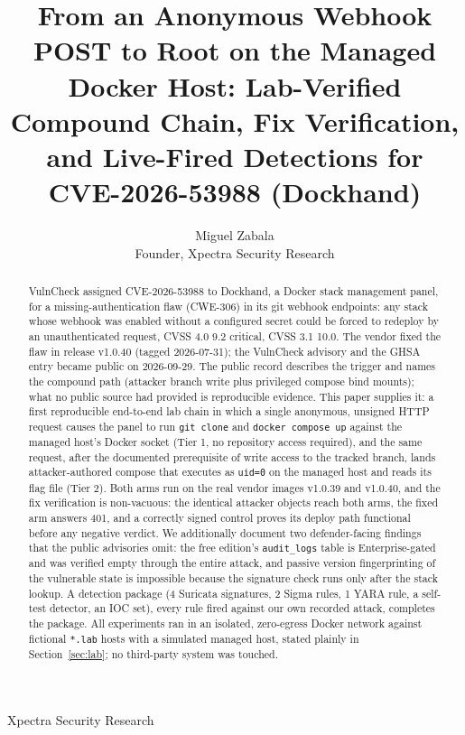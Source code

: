 \documentclass[journal]{IEEEtran}
\begin{document}
\title{From an Anonymous Webhook POST to Root on the Managed Docker Host:
Lab-Verified Compound Chain, Fix Verification, and Live-Fired Detections for
CVE-2026-53988 (Dockhand)}

\author{Miguel Zabala\\[0.5ex]
\small Founder, Xpectra Security Research}

{Xpectra Security Research \MakeLowercase\expandafter\the\year}

\maketitle

\begin{abstract}
VulnCheck assigned CVE-2026-53988 to Dockhand, a Docker stack management panel,
for a missing-authentication flaw (CWE-306) in its git webhook endpoints: any
stack whose webhook was enabled without a configured secret could be forced to
redeploy by an unauthenticated request, CVSS 4.0 9.2 critical, CVSS 3.1 10.0.
The vendor fixed the flaw in release v1.0.40 (tagged 2026-07-31); the VulnCheck
advisory and the GHSA entry became public on 2026-09-29. The public record
describes the trigger and names the compound path (attacker branch write plus
privileged compose bind mounts); what no public source had provided is
reproducible evidence. This paper supplies it: a first reproducible end-to-end
lab chain in which a single anonymous, unsigned HTTP request causes the panel
to run \texttt{git clone} and \texttt{docker compose up} against the managed
host's Docker socket (Tier 1, no repository access required), and the same
request, after the documented prerequisite of write access to the tracked
branch, lands attacker-authored compose that executes as \texttt{uid=0} on the
managed host and reads its flag file (Tier 2). Both arms run on the real vendor
images v1.0.39 and v1.0.40, and the fix verification is non-vacuous: the
identical attacker objects reach both arms, the fixed arm answers 401, and a
correctly signed control proves its deploy path functional before any negative
verdict. We additionally document two defender-facing findings that the public
advisories omit: the free edition's \texttt{audit\_logs} table is
Enterprise-gated and was verified empty through the entire attack, and passive
version fingerprinting of the vulnerable state is impossible because the
signature check runs only after the stack lookup. A detection package (4
Suricata signatures, 2 Sigma rules, 1 YARA rule, a self-test detector, an IOC
set), every rule fired against our own recorded attack, completes the package.
All experiments ran in an isolated, zero-egress Docker network against fictional
\texttt{*.lab} hosts with a simulated managed host, stated plainly in
Section~\ref{sec:lab}; no third-party system was touched.
\end{abstract}
\end{document}
